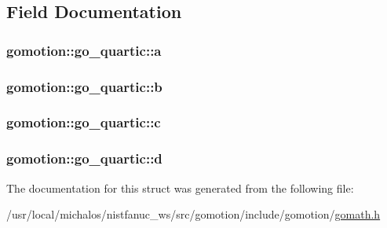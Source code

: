 \subsection{Field Documentation}
\hypertarget{structgomotion_1_1go__quartic_a160b6aab2661877f8027d8eaf0db0d32}{
\subsubsection[{a}]{ gomotion\-::go\-\_\-quartic\-::a}}\label{structgomotion_1_1go__quartic_a160b6aab2661877f8027d8eaf0db0d32}
\hypertarget{structgomotion_1_1go__quartic_a7fc463501a38f59900914bc8f93c5c84}{
\subsubsection[{b}]{ gomotion\-::go\-\_\-quartic\-::b}}\label{structgomotion_1_1go__quartic_a7fc463501a38f59900914bc8f93c5c84}
\hypertarget{structgomotion_1_1go__quartic_a0b6d02bd495ab899be138928394c4d46}{
\subsubsection[{c}]{ gomotion\-::go\-\_\-quartic\-::c}}\label{structgomotion_1_1go__quartic_a0b6d02bd495ab899be138928394c4d46}
\hypertarget{structgomotion_1_1go__quartic_a27261754dea678a29b22ecc87fe2f3f5}{
\subsubsection[{d}]{ gomotion\-::go\-\_\-quartic\-::d}}\label{structgomotion_1_1go__quartic_a27261754dea678a29b22ecc87fe2f3f5}


The documentation for this struct was generated from the following file\-:\begin{DoxyCompactItemize}
\item 
/usr/local/michalos/nistfanuc\-\_\-ws/src/gomotion/include/gomotion/\hyperlink{gomath_8h}{gomath.\-h}\end{DoxyCompactItemize}
